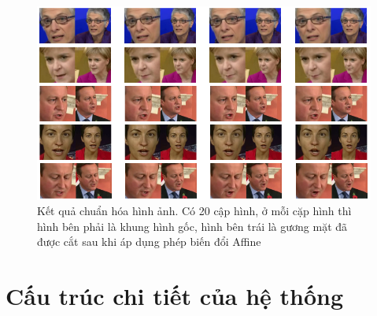 \begin{figure}[H]
    \centering
    \includegraphics[width=15cm]{./content/materials/preprocess-image.png}
    \caption{Kết quả chuẩn hóa hình ảnh. Có 20 cập hình, ở mỗi cặp hình thì hình bên phải là khung hình gốc, hình bên trái là gương mặt đã được cắt sau khi áp dụng phép biến đổi Affine}
\end{figure}


\section{Cấu trúc chi tiết của hệ thống}

